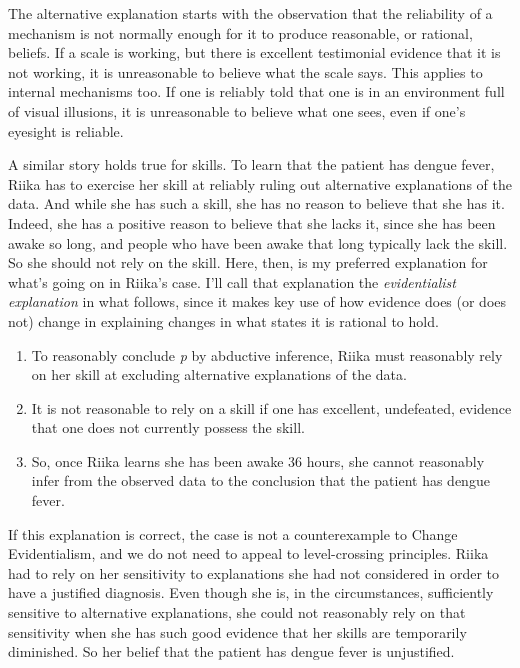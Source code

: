 The alternative explanation starts with the observation that the reliability of a mechanism is not normally enough for it to produce reasonable, or rational, beliefs. If a scale is working, but there is excellent testimonial evidence that it is not working, it is unreasonable to believe what the scale says. This applies to internal mechanisms too. If one is reliably told that one is in an environment full of visual illusions, it is unreasonable to believe what one sees, even if one's eyesight is reliable.

A similar story holds true for skills. To learn that the patient has dengue fever, \gls{Riika} has to exercise her skill at reliably ruling out alternative explanations of the data. And while she has such a skill, she has no reason to believe that she has it. Indeed, she has a positive reason to believe that she lacks it, since she has been awake so long, and people who have been awake that long typically lack the skill. So she should not rely on the skill. Here, then, is my preferred explanation for what's going on in \gls{Riika}'s case. I'll call that explanation the \emph{evidentialist explanation} in what follows, since it makes key use of how evidence does (or does not) change in explaining changes in what states it is rational to hold.

\begin{enumerate}
\item{} To reasonably conclude \emph{p} by abductive inference, \gls{Riika} must reasonably rely on her skill at excluding alternative explanations of the data.

\item{} It is not reasonable to rely on a skill if one has excellent, undefeated, evidence that one does not currently possess the skill.

\item{} So, once \gls{Riika} learns she has been awake 36 hours, she cannot reasonably infer from the observed data to the conclusion that the patient has dengue fever.

\end{enumerate}
If this explanation is correct, the case is not a counterexample to Change Evidentialism, and we do not need to appeal to level-crossing principles. \gls{Riika} had to rely on her sensitivity to explanations she had not considered in order to have a justified diagnosis. Even though she is, in the circumstances, sufficiently sensitive to alternative explanations, she could not reasonably rely on that sensitivity when she has such good evidence that her skills are temporarily diminished. So her belief that the patient has dengue fever is unjustified.

